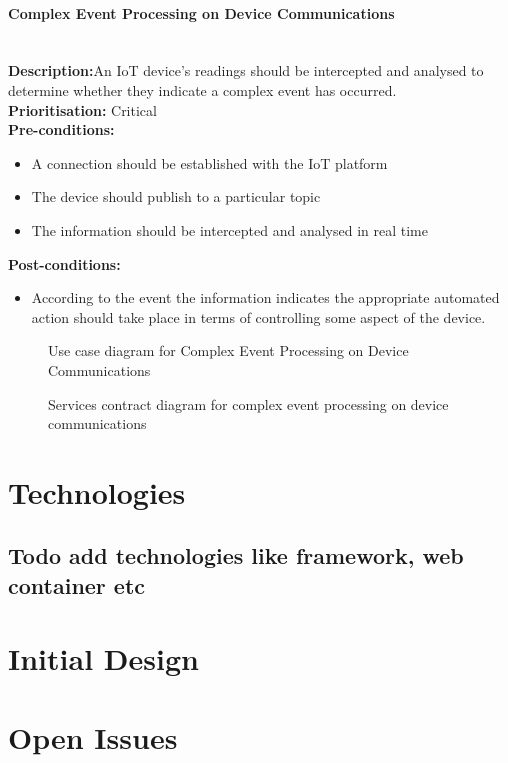\documentclass{article}
\begin{document}
	\paragraph{Complex Event Processing on Device Communications}\mbox{}\\
		\textbf{Description:}An IoT device's readings should be intercepted and analysed to determine whether they indicate a complex event has occurred.\\
		\textbf{Prioritisation:} Critical\\		
		\textbf{Pre-conditions:}
			\begin{itemize}
				\item A connection should be established with the IoT platform
				\item The device should publish to a particular topic
				\item The information should be intercepted and analysed in real time
			\end{itemize}
		\textbf{Post-conditions:}
			\begin{itemize}
				\item According to the event the information indicates the appropriate automated action should take place in terms of controlling some aspect of the device.
			\end{itemize}

		\begin{figure}[H]
			\caption{Use case diagram for Complex Event Processing on Device Communications}
		\end{figure}
		
		\begin{figure}[H]
			\caption{Services contract diagram for complex event processing on device communications}
		\end{figure}	
	
\section{Technologies}

\subsection{Todo add technologies like framework, web container etc}

\section{Initial Design}

\section{Open Issues}
\end{document}

